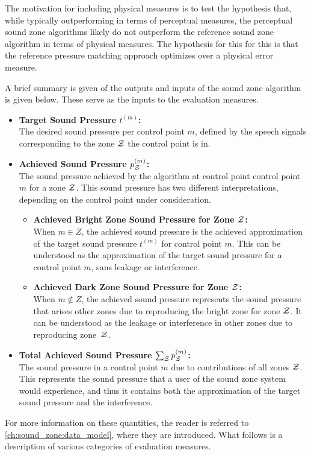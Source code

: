 The motivation for including physical measures is to test the hypothesis that, 
while typically outperforming in terms of perceptual measures, the perceptual sound zone algorithms likely do not 
outperform the reference sound zone algorithm in terms of physical measures.
The hypothesis for this for this is that the reference pressure matching approach optimizes over a physical error measure.

A brief summary is given of the outputs and inputs of the sound zone algorithm is given below.
These serve as the inputs to the evaluation measures.
\begin{itemize}
    \item \textbf{Target Sound Pressure $t^{(m)}$:}\\
        The desired sound pressure per control point $m$, defined by the speech signals 
        corresponding to the zone $\mathcal{Z}$ the control point is in.
    \item \textbf{Achieved Sound Pressure $p_{\mathcal{Z}}^{(m)}$:}\\
        The sound pressure achieved by the algorithm at control point control point $m$ for a zone $\mathcal{Z}$.
        This sound pressure has two different interpretations, depending on the control point under consideration.
        \begin{itemize}
            \item \textbf{Achieved Bright Zone Sound Pressure for Zone $\mathcal{Z}$:}\\
                When $m \in Z$, the achieved sound pressure is the achieved approximation of the 
                target sound pressure $t^{(m)}$ for control point $m$.
                This can be understood as the approximation of the target sound pressure for a control point $m$, sans leakage or interference. 
            \item \textbf{Achieved Dark Zone Sound Pressure for Zone $\mathcal{Z}$:}\\
                When $m \notin Z$, the achieved sound pressure represents the sound pressure 
                that arises other zones due to reproducing the bright zone for zone $\mathcal{Z}$. 
                It can be understood as the leakage or interference in other zones due to reproducing zone~$\mathcal{Z}$.
        \end{itemize}
    \item \textbf{Total Achieved Sound Pressure $\sum_{\mathcal{Z}} p_{\mathcal{Z}}^{(m)}$:}\\
        The sound pressure in a control point $m$ due to contributions of all zones $\mathcal{Z}$.
        This represents the sound pressure that a user of the sound zone system would experience,
        and thus it contains both the approximation of the target sound pressure and the interference.
\end{itemize}
For more information on these quantities, the reader is referred to \autoref{ch:sound_zone:data_model}, where they 
are introduced.
What follows is a description of various categories of evaluation measures.

